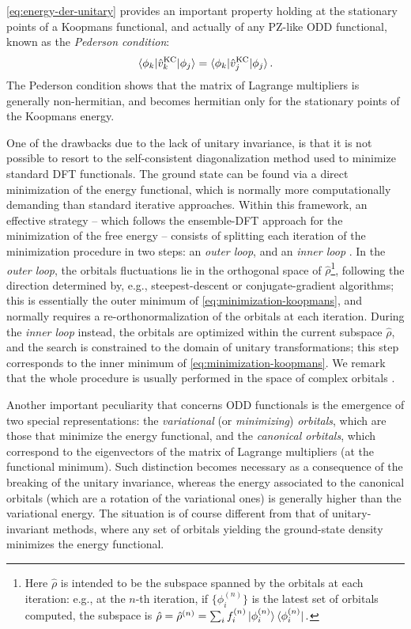 %
\cref{eq:energy-der-unitary} provides an important property holding at the stationary points of a Koopmans functional, and actually of any PZ-like ODD functional, known as the \emph{Pederson condition}:
%
\begin{equation}
    \braket{\phi_k | \hat{v}^{\rm KC}_k | \phi_j} = \braket{\phi_k | \hat{v}^{\rm KC}_j | \phi_j} .
    \label{eq:pederson-condition}
\end{equation}
%
The Pederson condition shows that the matrix of Lagrange multipliers is generally non-hermitian, and becomes hermitian only for the stationary points of the Koopmans energy.

One of the drawbacks due to the lack of unitary invariance, is that it is not possible to resort to the self-consistent diagonalization method used to minimize standard DFT functionals. The ground state can be found via a direct minimization of the energy functional, which is normally more computationally demanding than standard iterative approaches. Within this framework, an effective strategy -- which follows the ensemble-DFT approach for the minimization of the free energy \cite{marzari_ensemble_1997} -- consists of splitting each iteration of the minimization procedure in two steps: an \emph{outer loop}, and an \emph{inner loop} \cite{borghi_variational_2015,stengel_self-interaction_2008,klupfel_optimization_2012}. In the \emph{outer loop}, the orbitals fluctuations lie in the orthogonal space of $\hat{\rho}$\footnote{Here $\hat{\rho}$ is intended to be the subspace spanned by the orbitals at each iteration: e.g., at the $n$-th iteration, if $\{ \phi_i^{(n)} \}$ is the latest set of orbitals computed, the subspace is $\hat{\rho} = \hat{\rho}^{(n)} = \sum_i f_i^{(n)} \ket{\phi_i^{(n)}}\bra{\phi_i^{(n)}}.$}, following the direction determined by, e.g., steepest-descent or conjugate-gradient algorithms; this is essentially the outer minimum of \cref{eq:minimization-koopmans}, and normally requires a re-orthonormalization of the orbitals at each iteration. During the \emph{inner loop} instead, the orbitals are optimized within the current subspace $\hat{\rho}$, and the search is constrained to the domain of unitary transformations; this step corresponds to the inner minimum of \cref{eq:minimization-koopmans}. We remark that the whole procedure is usually performed in the space of complex orbitals \cite{klupfel_importance_2011,lehtola_complex_2016}.

Another important peculiarity that concerns ODD functionals is the emergence of two special representations: the \emph{variational} (or \emph{minimizing}) \emph{orbitals}, which are those that minimize the energy functional, and the \emph{canonical orbitals}, which correspond to the eigenvectors of the matrix of Lagrange multipliers (at the functional minimum). Such distinction becomes necessary as a consequence of the breaking of the unitary invariance, whereas the energy associated to the canonical orbitals (which are a rotation of the variational ones) is generally higher than the variational energy. The situation is of course different from that of unitary-invariant methods, where any set of orbitals yielding the ground-state density minimizes the energy functional.

